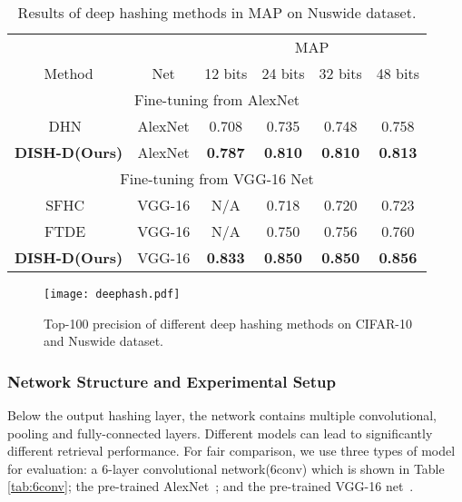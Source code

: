 \documentclass[conference]{IEEEtran}
\begin{document}
\begin{table}[t]
    \centering
    \footnotesize
    \begin{tabular}{c|c|cccc}
        \hline
         & & \multicolumn{4}{c}{MAP} \\
        Method & Net & 12 bits & 24 bits & 32 bits & 48 bits \\
        \hline
        \multicolumn{6}{c}{Fine-tuning from AlexNet} \\
        \hline
        DHN~\cite{zhu2016deep} & AlexNet & 0.708 & 0.735 & 0.748 & 0.758 \\
        \textbf{DISH-D(Ours)} & AlexNet & \textbf{0.787} & \textbf{0.810} & \textbf{0.810} & \textbf{0.813} \\
        \hline
        \multicolumn{6}{c}{Fine-tuning from VGG-16 Net} \\
        \hline
        SFHC~\cite{zhuang2016fast} & VGG-16 & N/A & 0.718 & 0.720 & 0.723 \\
        FTDE~\cite{zhuang2016fast} & VGG-16 & N/A & 0.750 & 0.756 & 0.760 \\
        \textbf{DISH-D(Ours)} & VGG-16 & \textbf{0.833} & \textbf{0.850} & \textbf{0.850} & \textbf{0.856} \\
        \hline
    \end{tabular}
    \caption{Results of deep hashing methods in MAP on Nuswide dataset.}
    \label{tab:nuswide_deep}
\end{table}

\begin{figure}[t]
    \centering
    \texttt{[image: deephash.pdf]}
    \caption{Top-100 precision of different deep hashing methods on CIFAR-10 and Nuswide dataset.}
    \label{fig:deephash}
\end{figure}

\subsubsection{Network Structure and Experimental Setup}

Below the output hashing layer, the network contains multiple convolutional, pooling and fully-connected layers. Different models can lead to significantly different retrieval performance. For fair comparison, we use three types of model for evaluation: a 6-layer convolutional network(6conv) which is shown in Table \ref{tab:6conv}; the pre-trained AlexNet~\cite{krizhevsky2012imagenet}; and the pre-trained VGG-16 net~\cite{simonyan2014very}.
\end{document}
